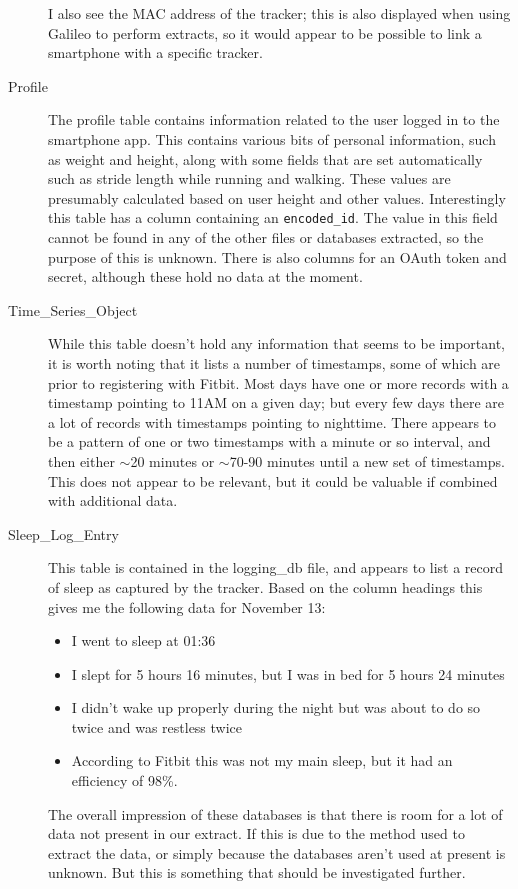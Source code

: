 \documentclass[a4paper,11pt,dvips]{article}
\begin{document}
\begin{description}
I also see the MAC address of the tracker; this is also displayed when using Galileo to perform extracts, so it would appear to be possible to link a smartphone with a specific tracker.
\item [Profile] The profile table contains information related to the user logged in to the smartphone app. This contains various bits of personal information, such as weight and height, along with some fields that are set automatically such as stride length while running and walking. These values are presumably calculated based on user height and other values. Interestingly this table has a column containing an \texttt{encoded\_id}. The value in this field cannot be found in any of the other files or databases extracted, so the purpose of this is unknown. There is also columns for an OAuth token and secret, although these hold no data at the moment.
\item [Time\_Series\_Object] While this table doesn't hold any information that seems to be important, it is worth noting that it lists a number of timestamps, some of which are prior to registering with Fitbit. Most days have one or more records with a timestamp pointing to 11AM on a given day; but every few days there are a lot of records with timestamps pointing to nighttime. There appears to be a pattern of one or two timestamps with a minute or so interval, and then either $\sim$20 minutes or $\sim$70-90 minutes until a new set of timestamps. This does not appear to be relevant, but it could be valuable if combined with additional data.
\item [Sleep\_Log\_Entry] This table is contained in the logging\_db file, and appears to list a record of sleep as captured by the tracker. Based on the column headings this gives me the following data for November 13:
\begin{itemize}
\item I went to sleep at 01:36
\item I slept for 5 hours 16 minutes, but I was in bed for 5 hours 24 minutes
\item I didn't wake up properly during the night but was about to do so twice and was restless twice
\item According to Fitbit this was not my main sleep, but it had an efficiency of 98\%.
\end{itemize}
The overall impression of these databases is that there is room for a lot of data not present in our extract. If this is due to the method used to extract the data, or simply because the databases aren't used at present is unknown. But this is something that should be investigated further.
\end{description}
\end{document}
